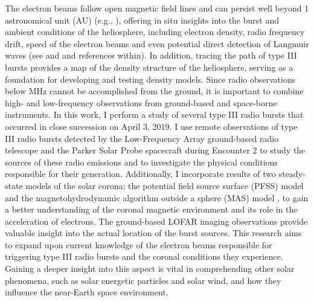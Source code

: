 The electron beams follow open magnetic field lines and can persist well beyond 1 astronomical unit (AU) (e.g., \cite{dulk_1985, boudjada_2020}), offering in situ insights into the burst and ambient conditions of the heliosphere, including electron density, radio frequency drift, speed of the electron beams and even potential direct detection of Langmuir waves (see \cite{gurnett_1976, gurnett_1977} and \cite{reid_2014} and references within). In addition, tracing the path of type III bursts provides a map of the density structure of the heliosphere, serving as a foundation for developing and testing density models.
Since radio observations below  MHz cannot be accomplished from the ground, it is important to combine high- and low-frequency observations from ground-based and space-borne instruments.
In this work, I perform a study of several type III radio bursts that occurred in close succession on April 3, 2019. I use remote observations of type III radio bursts detected by the Low-Frequency Array \cite[LOFAR]{lofar_2013} ground-based radio telescope and the Parker Solar Probe \cite[PSP]{fox_2016} spacecraft during Encounter 2 to study the sources of these radio emissions and to investigate the physical conditions responsible for their generation. Additionally, I incorporate results of two steady-state models of the solar corona: the potential field source surface (PFSS) model \cite{altschuler_1969, schatten_1969} and the magnetohydrodynamic algorithm outside a sphere (MAS) model \cite{mhd_1999}, to gain a better understanding of the coronal magnetic environment and its role in the acceleration of electrons. 
The ground-based LOFAR imaging observations provide valuable insight into the actual location of the burst sources. This research aims to expand upon current knowledge of the electron beams responsible for triggering type III radio bursts and the coronal conditions they experience. Gaining a deeper insight into this aspect is vital in comprehending other solar phenomena, such as solar energetic particles and solar wind, and how they influence the near-Earth space environment.

